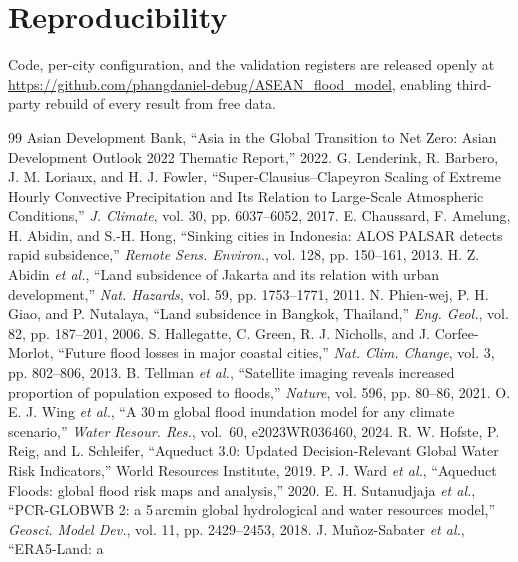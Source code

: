 \documentclass[conference]{IEEEtran}
\begin{document}
\section*{Reproducibility}
Code, per-city configuration, and the validation registers are released openly at
\url{https://github.com/phangdaniel-debug/ASEAN\_flood\_model}, enabling third-party
rebuild of every result from free data.

\begin{thebibliography}{99}
 Asian Development Bank, ``Asia in the Global Transition to Net Zero:
Asian Development Outlook 2022 Thematic Report,'' 2022.
 G. Lenderink, R. Barbero, J. M. Loriaux, and H. J. Fowler,
``Super-Clausius--Clapeyron Scaling of Extreme Hourly Convective Precipitation and
Its Relation to Large-Scale Atmospheric Conditions,'' \emph{J. Climate}, vol. 30,
pp. 6037--6052, 2017.
 E. Chaussard, F. Amelung, H. Abidin, and S.-H. Hong,
``Sinking cities in Indonesia: ALOS PALSAR detects rapid subsidence,'' \emph{Remote
Sens. Environ.}, vol. 128, pp. 150--161, 2013.
 H. Z. Abidin \emph{et al.}, ``Land subsidence of Jakarta and its
relation with urban development,'' \emph{Nat. Hazards}, vol. 59, pp. 1753--1771, 2011.
 N. Phien-wej, P. H. Giao, and P. Nutalaya, ``Land subsidence in
Bangkok, Thailand,'' \emph{Eng. Geol.}, vol. 82, pp. 187--201, 2006.
 S. Hallegatte, C. Green, R. J. Nicholls, and J.
Corfee-Morlot, ``Future flood losses in major coastal cities,'' \emph{Nat. Clim.
Change}, vol. 3, pp. 802--806, 2013.
 B. Tellman \emph{et al.}, ``Satellite imaging reveals increased
proportion of population exposed to floods,'' \emph{Nature}, vol. 596, pp. 80--86,
2021.
 O. E. J. Wing \emph{et al.}, ``A 30\,m global flood inundation
model for any climate scenario,'' \emph{Water Resour. Res.}, vol.~60,
e2023WR036460, 2024.
 R. W. Hofste, P. Reig, and L. Schleifer, ``Aqueduct 3.0: Updated
Decision-Relevant Global Water Risk Indicators,'' World Resources Institute, 2019.
 P. J. Ward \emph{et al.}, ``Aqueduct Floods: global flood risk maps
and analysis,'' 2020.
 E. H. Sutanudjaja \emph{et al.}, ``PCR-GLOBWB 2: a 5\,arcmin
global hydrological and water resources model,'' \emph{Geosci. Model Dev.}, vol. 11,
pp. 2429--2453, 2018.
 J. Mu\~{n}oz-Sabater \emph{et al.}, ``ERA5-Land: a

\end{thebibliography}
\end{document}
